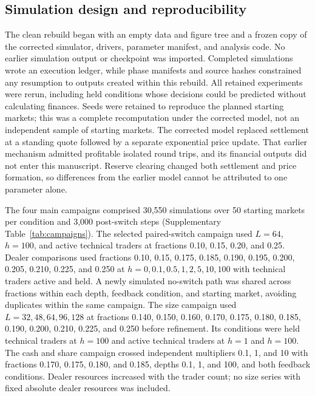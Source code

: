 \subsection{Simulation design and reproducibility}

The clean rebuild began with an empty data and figure tree and a frozen
copy of the corrected simulator, drivers, parameter manifest, and analysis
code. No earlier simulation output or checkpoint was imported. Completed
simulations wrote an execution ledger, while phase manifests and source
hashes constrained any resumption to outputs created within this rebuild.
All retained experiments were rerun, including held conditions whose
decisions could be predicted without calculating finances. Seeds were
retained to reproduce the planned starting markets; this was a complete
recomputation under the corrected model, not an independent sample of
starting markets. The corrected model replaced settlement at a standing
quote followed by a separate exponential price update. That earlier
mechanism admitted profitable isolated round trips, and its financial
outputs did not enter this manuscript. Reserve clearing changed both
settlement and price formation, so differences from the earlier model
cannot be attributed to one parameter alone.

The four main campaigns comprised 30,550 simulations over 50 starting
markets per condition and 3,000 post-switch steps
(Supplementary Table~\ref{tab:campaigns}). The selected paired-switch
campaign used $L=64$, $h=100$, and active technical traders at fractions
0.10, 0.15, 0.20, and 0.25. Dealer comparisons used fractions 0.10, 0.15,
0.175, 0.185, 0.190, 0.195, 0.200, 0.205, 0.210, 0.225, and 0.250 at
$h=0,0.1,0.5,1,2,5,10,100$ with technical traders active and held.
A newly simulated no-switch path was shared across fractions within
each depth, feedback condition, and starting market, avoiding duplicates
within the same campaign. The size campaign used $L=32,48,64,96,128$ at
fractions 0.140, 0.150, 0.160, 0.170, 0.175, 0.180, 0.185, 0.190,
0.200, 0.210, 0.225, and 0.250 before refinement. Its conditions were
held technical traders at $h=100$ and active technical traders at
$h=1$ and $h=100$. The cash and share campaign crossed independent
multipliers 0.1, 1, and 10 with fractions 0.170, 0.175, 0.180, and
0.185, depths 0.1, 1, and 100, and both feedback conditions. Dealer
resources increased with the trader count; no size series with fixed
absolute dealer resources was included.


